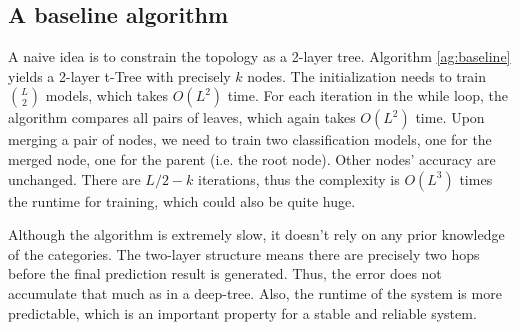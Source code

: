 \documentclass{article}
\begin{document}
\subsection{A baseline algorithm} \label{ss:baseline}
A naive idea is to constrain the topology as a 2-layer tree. Algorithm \ref{ag:baseline} yields a 2-layer t-Tree with precisely $k$ nodes. The initialization needs to train  $\binom{L}{2}$ models, which takes $O(L^2)$ time. For each iteration in the while loop, the algorithm compares all pairs of leaves, which again takes $O(L^2)$ time. Upon merging a pair of nodes, we need to train two classification models, one for the merged node, one for the parent (i.e. the root node). Other nodes' accuracy are unchanged. There are $L/2-k$ iterations, thus the complexity is $O(L^3)$ times the runtime for training, which could also be quite huge. 

Although the algorithm is extremely slow, it doesn't rely on any prior knowledge of the categories. The two-layer structure means there are precisely two hops before the final prediction result is generated. Thus, the error does not accumulate that much as in a deep-tree. Also, the runtime of the system is more predictable, which is an important property for a stable and reliable system.
\end{document}
